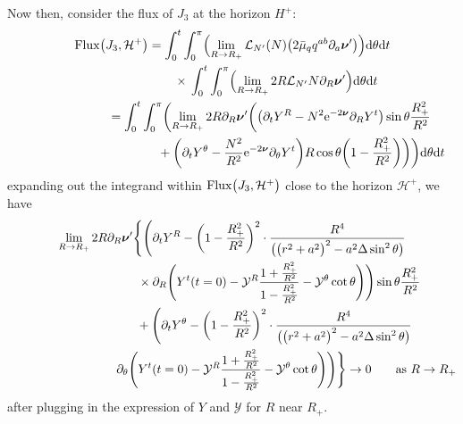 \documentclass[pdftex]{sigma}
\def\ptl{\partial}%
\def\mbo#1{\boldsymbol{#1}}%
\numberwithin{equation}{section}
\begin{document}
Now then, consider the flux of $J_3$ at the horizon $H^+$:
\begin{gather*}
{\rm Flux} \bigl(J_3, \mathcal{H}^+\bigr) = \int^t_0 \int^\pi _0 \Bigl(\lim_{R \to R_+} \mathcal{L}_{N'} (N) \bigl(2 \bar{\mu}_q q^{ab} \ptl_a \mbo{\nu}'\bigr) \Bigr) {\rm d}\theta {\rm d}t \notag\\
 \hphantom{{\rm Flux} \bigl(J_3, \mathcal{H}^+\bigr) =}{}
\times{}\int^t_0 \int^\pi_0 \Bigl(\lim_{R \to R_+} 2 R \mathcal{L}_{N'} N \ptl_R \mbo{\nu}' \Bigr) {\rm d}\theta {\rm d}t \notag\\
 \hphantom{{\rm Flux} \bigl(J_3, \mathcal{H}^+\bigr)}{}
= \int^t_0 \int^\pi _0 \biggl(\lim_{R \to R_+} 2 R \ptl_R \mbo{\nu}' \biggl(\bigl(\ptl_t Y^R - N^2 {\rm e}^{-2 \mbo{\nu}} \ptl_R Y^t\bigr) \sin \theta \frac{R^2_+}{R^2} \notag\\
 \hphantom{{\rm Flux} \bigl(J_3, \mathcal{H}^+\bigr)= \int^t_0 \int^\pi _0 \biggl(}{}
 + \biggl(\ptl_t Y^\theta - \frac{N^2}{R^2} {\rm e}^{-2 \mbo{\nu}} \ptl_\theta Y^t\biggr) R \cos \theta \biggl(1-\frac{R^2_+}{R^2}\biggr) \biggr) \biggr) {\rm d}\theta {\rm d}t
\end{gather*}
expanding out the integrand within $ {\rm Flux} \bigl(J_3, \mathcal{H}^+\bigr)$ close to the horizon $\mathcal{H}^+$, we have
\begin{gather*}
 \lim_{R \to R_+} 2R \ptl_R \mbo{\nu}' \Bigg\{ \Biggl(\ptl_t Y^R - \biggl(1 - \frac{R^2_+}{R^2} \biggr)^2 \cdot \frac{R^4}{ \bigl(\bigl(r^2+a^2\bigr)^2 -a^2 \Delta \sin^2 \theta\bigr)} \\
 \hphantom{\lim_{R \to R_+} 2R \ptl_R \mbo{\nu}' \Bigg\{\Biggl(}{}
 \times \ptl_R \Biggl(Y^t(t=0) - \mathcal{Y}^R \frac{1+ \frac{R^2_+}{R^2}}{1-\frac{R^2_+}{R^2}} - \mathcal{Y}^\theta \cot \theta \Biggr) \Biggr)\sin \theta \frac{R^2_+}{R^2} \notag\\
\hphantom{\lim_{R \to R_+} 2R \ptl_R \mbo{\nu}' \Bigg\{ }{}
 + \Biggl( \ptl_t Y^\theta - \biggl(1- \frac{R^2_+}{R^2}\biggr)^2 \cdot \frac{R^4}{ \bigl(\bigl(r^2+a^2\bigr)^2 -a^2 \Delta
	\sin^2 \theta \bigr)} \notag\\
\hphantom{\lim_{R \to R_+} 2R \ptl_R \mbo{\nu}' \Bigg\{ + \Biggl(}{}
 \ptl_\theta \Biggl(Y^t (t=0) - \mathcal{Y}^R \frac{1 + \frac{R^2_+}{R^2}} {{1-\frac{R^2_+}{R^2}} } - \mathcal{Y}^ \theta \cot \theta \Biggr) \Biggr) \Bigg\} \to 0 \qquad \text{as} \ R \to R_+
\end{gather*}
after plugging in the expression of $Y$ and $\mathcal{Y}$ for $R$ near $R_+$.
\end{document}
